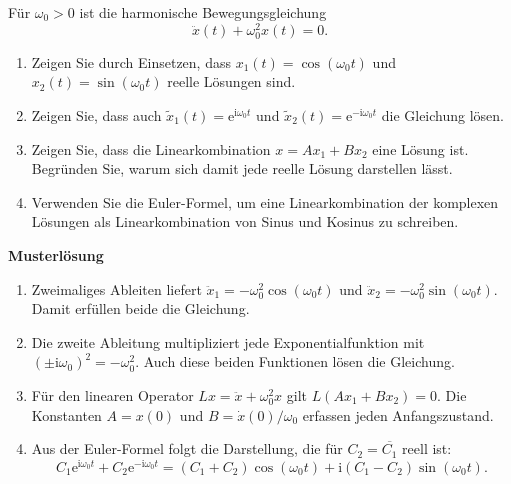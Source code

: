 \begin{ExerciseBlock}
Für $\omega_0>0$ ist die harmonische Bewegungsgleichung
\[
 \ddot x(t)+\omega_0^2x(t)=0.
\]
\begin{enumerate}
\item Zeigen Sie durch Einsetzen, dass $x_1(t)=\cos(\omega_0t)$ und $x_2(t)=\sin(\omega_0t)$ reelle Lösungen sind.
\item Zeigen Sie, dass auch $\widetilde x_1(t)=\mathrm e^{\mathrm i\omega_0t}$ und $\widetilde x_2(t)=\mathrm e^{-\mathrm i\omega_0t}$ die Gleichung lösen.
\item Zeigen Sie, dass die Linearkombination $x=Ax_1+Bx_2$ eine Lösung ist. Begründen Sie, warum sich damit jede reelle Lösung darstellen lässt.
\item Verwenden Sie die Euler-Formel, um eine Linearkombination der komplexen Lösungen als Linearkombination von Sinus und Kosinus zu schreiben.
\end{enumerate}
\end{ExerciseBlock}
\begin{Solution}
\par\medskip\noindent\textbf{Musterlösung}\par\nopagebreak[4]
\begin{enumerate}
\item Zweimaliges Ableiten liefert $\ddot x_1=-\omega_0^2\cos(\omega_0t)$ und $\ddot x_2=-\omega_0^2\sin(\omega_0t)$. Damit erfüllen beide die Gleichung.
\item Die zweite Ableitung multipliziert jede Exponentialfunktion mit $(\pm\mathrm i\omega_0)^2=-\omega_0^2$. Auch diese beiden Funktionen lösen die Gleichung.
\item Für den linearen Operator $Lx=\ddot x+\omega_0^2x$ gilt $L(Ax_1+Bx_2)=0$. Die Konstanten $A=x(0)$ und $B=\dot x(0)/\omega_0$ erfassen jeden Anfangszustand.
\item Aus der Euler-Formel folgt die Darstellung, die für $C_2=\overline{C_1}$ reell ist:
\[
 C_1\mathrm e^{\mathrm i\omega_0t}+C_2\mathrm e^{-\mathrm i\omega_0t}
 =(C_1+C_2)\cos(\omega_0t)+\mathrm i(C_1-C_2)\sin(\omega_0t).
\]
\end{enumerate}
\end{Solution}
